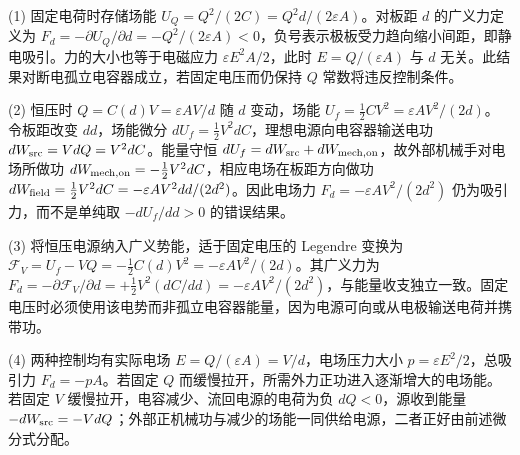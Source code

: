 (1) 固定电荷时存储场能 \(U_Q=Q^2/(2C)=Q^2d/(2\varepsilon A)\)。对板距 \(d\) 的广义力定义为 \(F_d=-\partial U_Q/\partial d=-Q^2/(2\varepsilon A)<0\)，负号表示极板受力趋向缩小间距，即静电吸引。力的大小也等于电磁应力 \(\varepsilon E^2A/2\)，此时 \(E=Q/(\varepsilon A)\) 与 \(d\) 无关。此结果对断电孤立电容器成立，若固定电压而仍保持 \(Q\) 常数将违反控制条件。

(2) 恒压时 \(Q=C(d)V=\varepsilon AV/d\) 随 \(d\) 变动，场能 \(U_f=\frac12CV^2=\varepsilon AV^2/(2d)\)。令板距改变 \(dd\)，场能微分 \(dU_f=\frac12V^2dC\)，理想电源向电容器输送电功 \(dW_{\rm src}=VdQ=V^2dC\)。能量守恒 \(dU_f=dW_{\rm src}+dW_{\rm mech,on}\)，故外部机械手对电场所做功 \(dW_{\rm mech,on}=-\frac12V^2dC\)，相应电场在板距方向做功 \(dW_{\rm field}=\frac12V^2dC=-\varepsilon AV^2dd/(2d^2)\)。因此电场力 \(F_d=-\varepsilon AV^2/(2d^2)\) 仍为吸引力，而不是单纯取 \(-dU_f/dd>0\) 的错误结果。

(3) 将恒压电源纳入广义势能，适于固定电压的 Legendre 变换为 \(\mathcal F_V=U_f-VQ=-\frac12C(d)V^2=-\varepsilon AV^2/(2d)\)。其广义力为 \(F_d=-\partial\mathcal F_V/\partial d=+\frac12V^2(dC/dd)=-\varepsilon AV^2/(2d^2)\)，与能量收支独立一致。固定电压时必须使用该电势而非孤立电容器能量，因为电源可向或从电极输送电荷并携带功。

(4) 两种控制均有实际电场 \(E=Q/(\varepsilon A)=V/d\)，电场压力大小 \(p=\varepsilon E^2/2\)，总吸引力 \(F_d=-pA\)。若固定 \(Q\) 而缓慢拉开，所需外力正功进入逐渐增大的电场能。若固定 \(V\) 缓慢拉开，电容减少、流回电源的电荷为负 \(dQ<0\)，源收到能量 \(-dW_{\rm src}=-VdQ\)；外部正机械功与减少的场能一同供给电源，二者正好由前述微分式分配。
